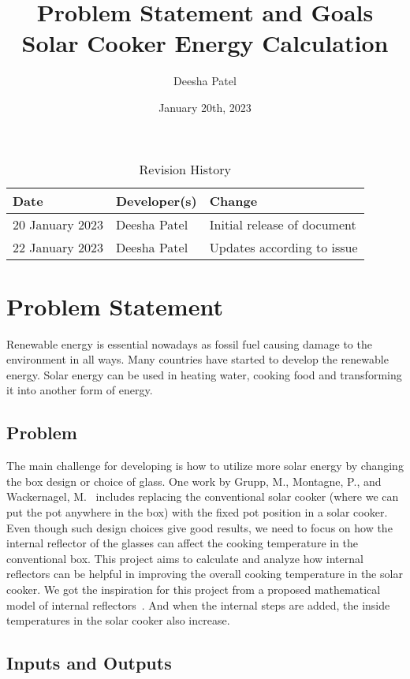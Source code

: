 \documentclass{article}
\title{Problem Statement and Goals\\Solar Cooker Energy Calculation}
\author{Deesha Patel}
\date{January 20th, 2023}
\begin{document}
\maketitle
\begin{table}[hp]
\caption{Revision History} \label{TblRevisionHistory}
\begin{tabularx}{\textwidth}{llX}
\toprule
\textbf{Date} & \textbf{Developer(s)} & \textbf{Change}\\
\midrule
20 January 2023 & Deesha Patel & Initial release of document\\
22 January 2023 & Deesha Patel & Updates according to issue\\ 
\bottomrule
\end{tabularx}
\end{table}

\section{Problem Statement}

Renewable energy is essential nowadays as fossil fuel causing damage to the environment in all ways. Many countries have started to develop the renewable energy. Solar energy can be used in heating water, cooking food and transforming it into another form of energy. 


\subsection{Problem}

 The main challenge for developing is how to utilize more solar energy by changing the box design or choice of glass. One work by Grupp, M., Montagne, P., and Wackernagel, M.~\cite{NovelBoxType} includes replacing the conventional solar cooker (where we can put the pot anywhere in the box) with the fixed pot position in a solar cooker. Even though such design choices give good results, we need to focus on how the internal reflector of the glasses can affect the cooking temperature in the conventional box. This project aims to calculate and analyze how internal reflectors can be helpful in improving the overall cooking temperature in the solar cooker. We got the inspiration for this project from a proposed mathematical model of internal reflectors~\cite{MathsModel}. And when the internal steps are added, the inside temperatures in the solar cooker also increase. 

\subsection{Inputs and Outputs}
\end{document}
